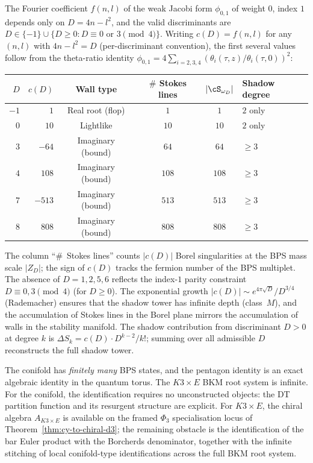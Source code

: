 \begin{example}
\label{ex:k3e-discriminant-table}
The Fourier coefficient $f(n, l)$ of the weak Jacobi form $\phi_{0,1}$ of weight $0$, index $1$ depends only on $D = 4n - l^2$, and the valid discriminants are $D \in \{-1\} \cup \{D \geq 0 : D \equiv 0 \text{ or } 3 \pmod 4\}$. Writing $c(D) = f(n, l)$ for any $(n, l)$ with $4n - l^2 = D$ (per-discriminant convention), the first several values follow from the theta-ratio identity $\phi_{0,1} = 4\sum_{i = 2, 3, 4} (\theta_i(\tau, z)/\theta_i(\tau, 0))^2$:
\begin{center}
\renewcommand{\arraystretch}{1.2}
\begin{tabular}{@{}rrcccl@{}}
\toprule
$D$ & $c(D)$ & Wall type & $\#$ Stokes lines & $|\cS_{\omega_D}|$ & Shadow degree \\
\midrule
$-1$ & $1$ & Real root (flop) & $1$ & $1$ & $2$ only \\
$0$ & $10$ & Lightlike & $10$ & $10$ & $2$ only \\
$3$ & $-64$ & Imaginary (bound) & $64$ & $64$ & $\geq 3$ \\
$4$ & $108$ & Imaginary (bound) & $108$ & $108$ & $\geq 3$ \\
$7$ & $-513$ & Imaginary (bound) & $513$ & $513$ & $\geq 3$ \\
$8$ & $808$ & Imaginary (bound) & $808$ & $808$ & $\geq 3$ \\
\bottomrule
\end{tabular}
\end{center}
The column ``$\#$~Stokes lines'' counts $|c(D)|$ Borel singularities at the BPS mass scale $|Z_D|$; the sign of $c(D)$ tracks the fermion number of the BPS multiplet. The absence of $D = 1, 2, 5, 6$ reflects the index-$1$ parity constraint $D \equiv 0, 3 \pmod 4$ (for $D \geq 0$). The exponential growth $|c(D)| \sim e^{4\pi\sqrt{D}}/D^{3/4}$ (Rademacher) ensures that the shadow tower has infinite depth (class~$M$), and the accumulation of Stokes lines in the Borel plane mirrors the accumulation of walls in the stability manifold. The shadow contribution from discriminant $D > 0$ at degree $k$ is $\Delta S_k = c(D) \cdot D^{k-2}/k!$; summing over all admissible $D$ reconstructs the full shadow tower.
\end{example}

\begin{remark}
\label{rem:conifold-vs-k3e}
The conifold has \emph{finitely many} BPS states, and the pentagon identity is an exact algebraic identity in the quantum torus. The \(K3 \times E\) BKM root system is infinite. For the conifold, the identification requires no unconstructed objects: the DT partition function and its resurgent structure are explicit. For $K3 \times E$, the chiral algebra $A_{K3 \times E}$ is available on the framed $\Phi_3$ specialisation locus of Theorem~\ref{thm:cy-to-chiral-d3}; the remaining obstacle is the identification of the bar Euler product with the Borcherds denominator, together with the infinite stitching of local conifold-type identifications across the full BKM root system.
\end{remark}

